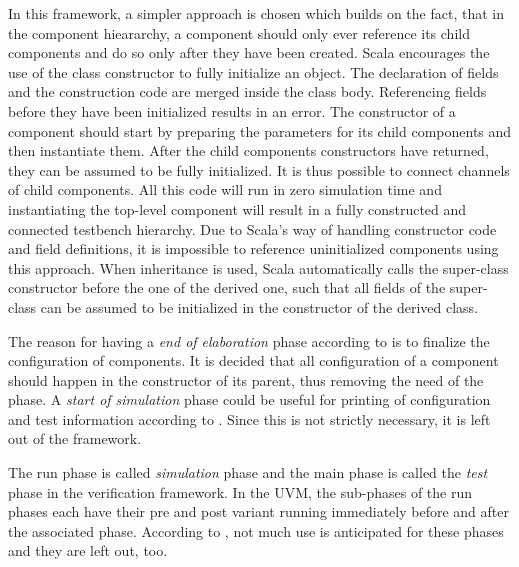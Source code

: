 In this framework, a simpler approach is chosen which builds on the fact, that in the component hieararchy, a component
should only ever reference its child components and do so only after they have been created. Scala encourages the use of
the class constructor to fully initialize an object. The declaration of fields and the construction code are merged
inside the class body. Referencing fields before they have been initialized results in an error. The constructor of a
component should start by preparing the parameters for its child components and then instantiate them. After the
child components constructors have returned, they can be assumed to be fully initialized. It is thus possible to
connect channels of child components. All this
code will run in zero simulation time and instantiating the top-level component will result in a fully constructed
and connected testbench hierarchy. Due to Scala's way of handling constructor code and field definitions, it is
impossible to reference uninitialized components using this approach. When inheritance is used, Scala automatically
calls the super-class constructor before the one of the derived one, such that all fields of the super-class can be
assumed to be initialized in the constructor of the derived class.

The reason for having a \textit{end of elaboration} phase according to \cite[Ch 4.6]{mehta2018asic} is to finalize
the configuration of components. It is decided that all configuration of a component should happen in the constructor
of its parent, thus removing the need of the phase. A \textit{start of simulation} phase could be useful for printing
of configuration and test information according to \cite[4.6]{mehta2018asic}. Since this is not strictly
necessary, it is left out of the framework.

The run phase is called \textit{simulation} phase and the main phase is called the \textit{test} phase in the
verification framework. In the UVM, the sub-phases of the run phases each have their pre and post variant running
immediately before and
after the associated phase. According to \cite[Ch 4.6]{mehta2018asic}, not much use is anticipated for these phases
and they are left out, too.

